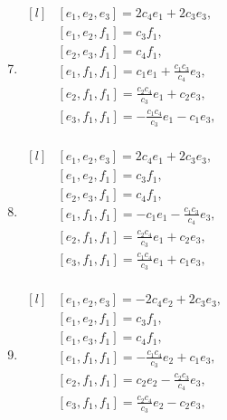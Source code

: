 \begin{adjustwidth*}{-0.5cm}{0cm}
\begin{multicols*}{2}
\begin{enumerate}
    \setcounter{enumi}{6}
    \item $\begin{matrix*}[l]
            & [e_1, e_2, e_3] = 2 c_{4} e_1  + 2 c_{3} e_3, \\
            & [e_1, e_2, f_1] = c_{3} f_1, \\
            & [e_2, e_3, f_1] = c_{4} f_1, \\
            & [e_1, f_1, f_1] = c_{1} e_1  + \frac{c_{1} c_{3}}{c_{4}} e_3, \\
            & [e_2, f_1, f_1] = \frac{c_{2} c_{4}}{c_{3}} e_1  + c_{2} e_3, \\
            & [e_3, f_1, f_1] = -\frac{c_{1} c_{4}}{c_{3}} e_1  - c_{1} e_3, \\
        \end{matrix*}$

    \item $\begin{matrix*}[l]
            & [e_1, e_2, e_3] = 2 c_{4} e_1  + 2 c_{3} e_3, \\
            & [e_1, e_2, f_1] = c_{3} f_1, \\
            & [e_2, e_3, f_1] = c_{4} f_1, \\
            & [e_1, f_1, f_1] = -c_{1} e_1  - \frac{c_{1} c_{3}}{c_{4}} e_3, \\
            & [e_2, f_1, f_1] = \frac{c_{2} c_{4}}{c_{3}} e_1  + c_{2} e_3, \\
            & [e_3, f_1, f_1] = \frac{c_{1} c_{4}}{c_{3}} e_1  + c_{1} e_3, \\
        \end{matrix*}$

    \item $\begin{matrix*}[l]
            & [e_1, e_2, e_3] =  - 2 c_{4} e_2 + 2 c_{3} e_3, \\
            & [e_1, e_2, f_1] = c_{3} f_1, \\
            & [e_1, e_3, f_1] = c_{4} f_1, \\
            & [e_1, f_1, f_1] =  - \frac{c_{1} c_{4}}{c_{3}} e_2 + c_{1} e_3, \\
            & [e_2, f_1, f_1] =  c_{2} e_2 - \frac{c_{2} c_{3}}{c_{4}} e_3, \\
            & [e_3, f_1, f_1] =  \frac{c_{2} c_{4}}{c_{3}} e_2 - c_{2} e_3, \\
        \end{matrix*}$


\end{enumerate}
\end{multicols*}
\end{adjustwidth*}

